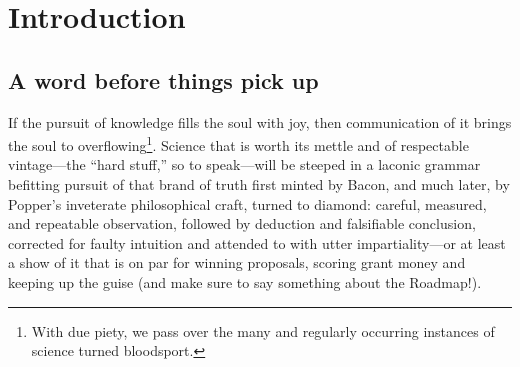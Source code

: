 
\chapter{Introduction}
\label{chp:intro}


\section{A word before things pick up}

If the pursuit of knowledge fills the soul with joy, then
communication of it brings the soul to overflowing\footnote{With due
  piety, we pass over the many and regularly occurring instances of
  science turned bloodsport.}. Science that is worth its mettle and of
respectable vintage---the ``hard stuff,'' so to speak---will be
steeped in a laconic grammar befitting pursuit of that brand of truth
first minted by Bacon, and much later, by Popper's inveterate
philosophical craft, turned to diamond: careful, measured, and
repeatable observation, followed by deduction and falsifiable
conclusion, corrected for faulty intuition and attended to with utter
impartiality---or at least a show of it that is on par for winning
proposals, scoring grant money and keeping up the guise (and make sure
to say something about the Roadmap!).

